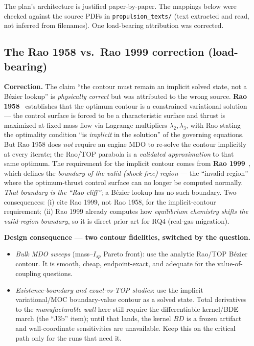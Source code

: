 \documentclass[11pt]{article}
\newcommand{\cmd}[1]{\nolinkurl{#1}}
\begin{document}
The plan's architecture is justified paper-by-paper. The mappings below were
checked against the source PDFs in \cmd{propulsion_texts/} (text extracted and
read, not inferred from filenames). One load-bearing attribution was corrected.

\subsection{The Rao 1958 vs.\ Rao 1999 correction (load-bearing)}

\begin{warnbox}
\textbf{Correction.} The claim ``the contour must remain an implicit solved
state, not a B\'ezier lookup'' is \emph{physically correct} but was attributed
to the wrong source. \textbf{Rao 1958}~\cite{rao1958} establishes that the
optimum contour is a constrained variational solution --- the control surface is
forced to be a characteristic surface and thrust is maximized at fixed mass flow
via Lagrange multipliers $\lambda_2,\lambda_3$, with Rao stating the optimality
condition ``is \emph{implicit} in the solution'' of the governing equations.
But Rao 1958 does \emph{not} require an engine MDO to re-solve the contour
implicitly at every iterate; the Rao/TOP parabola is a \emph{validated
approximation} to that same optimum. The requirement for the implicit contour
comes from \textbf{Rao 1999}~\cite{rao1999}, which defines the \emph{boundary of
the valid (shock-free) region} --- the ``invalid region'' where the
optimum-thrust control surface can no longer be computed normally. \emph{That
boundary is the ``Rao cliff''}; a B\'ezier lookup has no such boundary. Two
consequences: (i) cite Rao 1999, not Rao 1958, for the implicit-contour
requirement; (ii) Rao 1999 already computes how \emph{equilibrium chemistry
shifts the valid-region boundary}, so it is direct prior art for
RQ4 (real-gas migration).
\end{warnbox}

\noindent\textbf{Design consequence --- two contour fidelities, switched by the question.}
\begin{itemize}[leftmargin=1.4em,itemsep=2pt]
\item \emph{Bulk MDO sweeps} (mass--$I_{sp}$ Pareto front): use the analytic
Rao/TOP B\'ezier contour. It is smooth, cheap, endpoint-exact, and adequate
for the value-of-coupling questions.
\item \emph{Existence-boundary and exact-vs-TOP studies}: use the implicit
variational/MOC boundary-value contour as a solved state. Total derivatives to
the \emph{manufacturable wall} here still require the differentiable
kernel/BDE march (the ``J3b'' item); until that lands, the kernel $BD$ is a
frozen artifact and wall-coordinate sensitivities are unavailable. Keep this on
the critical path only for the runs that need it.
\end{itemize}
\end{document}
